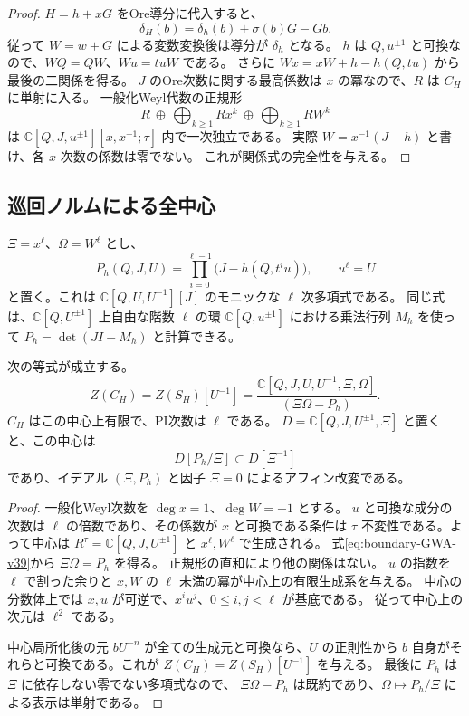 \begin{proof}
$H=h+xG$ をOre導分に代入すると、
\[
 \delta_H(b)=\delta_h(b)+\sigma(b)G-Gb.
\]
従って $W=w+G$ による変数変換後は導分が $\delta_h$ となる。
$h$ は $Q,u^{\pm1}$ と可換なので、$WQ=QW$、$Wu=tuW$ である。
さらに $Wx=xW+h-h(Q,tu)$ から最後の二関係を得る。
$J$ のOre次数に関する最高係数は $x$ の冪なので、$R$ は $C_H$ に単射に入る。
一般化Weyl代数の正規形
\[
 R\ \oplus\,\bigoplus_{k\ge1}Rx^k
 \ \oplus\,\bigoplus_{k\ge1}RW^k
\]
は $\mathbb C[Q,J,u^{\pm1}][x,x^{-1};\tau]$ 内で一次独立である。
実際 $W=x^{-1}(J-h)$ と書け、各 $x$ 次数の係数は零でない。
これが関係式の完全性を与える。
\end{proof}

\subsection{巡回ノルムによる全中心}

$\Xi=x^\ell$、$\Omega=W^\ell$ とし、
\begin{equation}\label{eq:boundary-spectral-norm-v39}
 P_h(Q,J,U)=\prod_{i=0}^{\ell-1}\bigl(J-h(Q,t^iu)\bigr),\qquad u^\ell=U
\end{equation}
と置く。これは $\mathbb C[Q,U,U^{-1}][J]$ のモニックな $\ell$ 次多項式である。
同じ式は、$\mathbb C[Q,U^{\pm1}]$ 上自由な階数 $\ell$ の環
$\mathbb C[Q,u^{\pm1}]$ における乗法行列 $M_h$ を使って
$P_h=\det(JI-M_h)$ と計算できる。

\begin{theorem}[中心とアフィン改変]
\label{thm:boundary-center-v39}
次の等式が成立する。
\begin{equation}\label{eq:boundary-center-v39}
 Z(C_H)=Z(S_H)[U^{-1}]
 =\frac{\mathbb C[Q,J,U,U^{-1},\Xi,\Omega]}{(\Xi\Omega-P_h)}.
\end{equation}
$C_H$ はこの中心上有限で、PI次数は $\ell$ である。
$D=\mathbb C[Q,J,U^{\pm1},\Xi]$ と置くと、この中心は
\[
 D[P_h/\Xi]\subset D[\Xi^{-1}]
\]
であり、イデアル $(\Xi,P_h)$ と因子 $\Xi=0$ によるアフィン改変である。
\end{theorem}

\begin{proof}
一般化Weyl次数を $\deg x=1$、$\deg W=-1$ とする。
$u$ と可換な成分の次数は $\ell$ の倍数であり、その係数が $x$ と可換である条件は
$\tau$ 不変性である。よって中心は
$R^\tau=\mathbb C[Q,J,U^{\pm1}]$ と $x^\ell,W^\ell$ で生成される。
式\eqref{eq:boundary-GWA-v39}から $\Xi\Omega=P_h$ を得る。
正規形の直和により他の関係はない。
$u$ の指数を $\ell$ で割った余りと $x,W$ の $\ell$ 未満の冪が中心上の有限生成系を与える。
中心の分数体上では $x,u$ が可逆で、$x^iu^j$、$0\le i,j<\ell$ が基底である。
従って中心上の次元は $\ell^2$ である。

中心局所化後の元 $bU^{-n}$ が全ての生成元と可換なら、$U$ の正則性から
$b$ 自身がそれらと可換である。これが $Z(C_H)=Z(S_H)[U^{-1}]$ を与える。
最後に $P_h$ は $\Xi$ に依存しない零でない多項式なので、
$\Xi\Omega-P_h$ は既約であり、$\Omega\mapsto P_h/\Xi$ による表示は単射である。
\end{proof}

